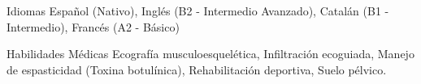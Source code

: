 

\begin{cvskills}

  \cvskill
    {Idiomas} %
    {Español (Nativo), Inglés (B2 - Intermedio Avanzado), Catalán (B1 - Intermedio), Francés (A2 - Básico)} %

  \cvskill
    {Habilidades Médicas} %
    {Ecografía musculoesquelética, Infiltración ecoguiada, Manejo de espasticidad (Toxina botulínica), Rehabilitación deportiva, Suelo pélvico.} %

\end{cvskills}

